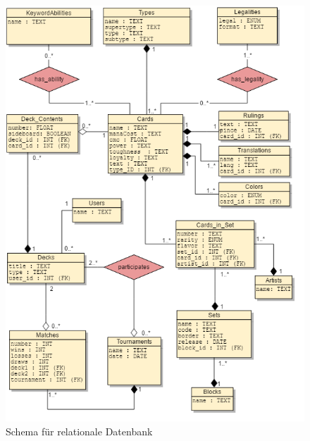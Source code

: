 \begin{figure}[H]
    \myfloatalign
    \includegraphics[width=\textwidth]{gfx/erm.png}
    \caption{Schema für relationale Datenbank}
    \label{fig:uml:schema}
\end{figure}

